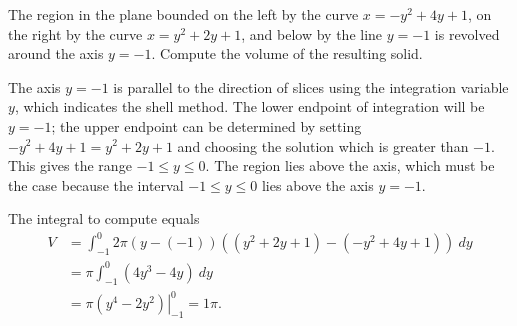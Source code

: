 \documentclass{ximera}
\begin{document}
\begin{question}%

The region in the plane bounded on the left by the curve \(x=-y^2+4y+1\), on the right by the curve \(x=y^2+2y+1\), and below by the line \(y = -1\) is revolved around the axis \(y = -1\). Compute the volume of the resulting solid.
\begin{multiplechoice}
\choice[correct]{\(\pi\)}
\choice{\(5\pi\)}
\choice{\(9\pi\)}
\choice{\(13\pi\)}
\choice{\(17\pi\)}
\choice{\(21\pi\)}
\end{multiplechoice}
\begin{feedback}
The axis \(y = -1\) is parallel to the direction of slices using the integration variable \(y\), which indicates the shell method. The lower endpoint of integration will be \(y = -1\); the upper endpoint can be determined by setting \(-y^2+4y+1 = y^2+2y+1\) and choosing the solution which is greater than \(-1\). This gives the range \(-1 \leq y \leq 0\). 
 The region lies above the axis, which must be the case because the interval \(-1 \leq y \leq 0\) lies above the axis \(y = -1\).
 \begin{hint}
The integral to compute equals \[ \begin{aligned} V &= \int_{-1}^{0}2 \pi (y-(-1))((y^2+2y+1)-(-y^2+4y+1))~ dy\\
& = \pi \int_{-1}^{0} (4y^3-4y)~ dy\\
& = \pi \left. \left(y^4-2y^2\right) \right|_{-1}^{0} = 1\pi. \end{aligned}\]
\end{hint}
\end{feedback}

\end{question}
\end{document}
